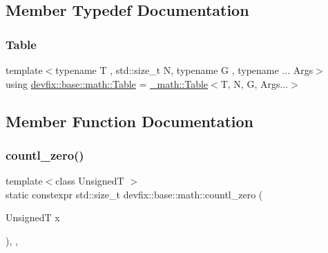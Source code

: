 \subsection{Member Typedef Documentation}
\mbox{\label{structdevfix_1_1base_1_1math_a6f2114ac2cf825b518cf5fefa00af6e3}} 
\subsubsection{\texorpdfstring{Table}{Table}}
{\footnotesize\ttfamily template$<$typename T , std\+::size\+\_\+t N, typename G , typename ... Args$>$ \\
using \hyperlink{structdevfix_1_1base_1_1math_a6f2114ac2cf825b518cf5fefa00af6e3}{devfix\+::base\+::math\+::\+Table} =  \hyperlink{structdevfix_1_1base_1_1__math_1_1Table}{\+\_\+math\+::\+Table}$<$T, N, G, Args...$>$}



\subsection{Member Function Documentation}
\mbox{\label{structdevfix_1_1base_1_1math_ab1781c7edecc9c462f16335f534b2470}} 
\subsubsection{\texorpdfstring{countl\+\_\+zero()}{countl\_zero()}}
{\footnotesize\ttfamily template$<$class UnsignedT $>$ \\
static constexpr std\+::size\+\_\+t devfix\+::base\+::math\+::countl\+\_\+zero (\begin{DoxyParamCaption}\item[{UnsignedT}]{x }\end{DoxyParamCaption})\hspace{0.3cm}{\ttfamily [inline]}, {\ttfamily [static]}, {\ttfamily [noexcept]}}

\mbox{\label{structdevfix_1_1base_1_1math_a4aa317a84af4eb10be4474c90cb47afe}} 
